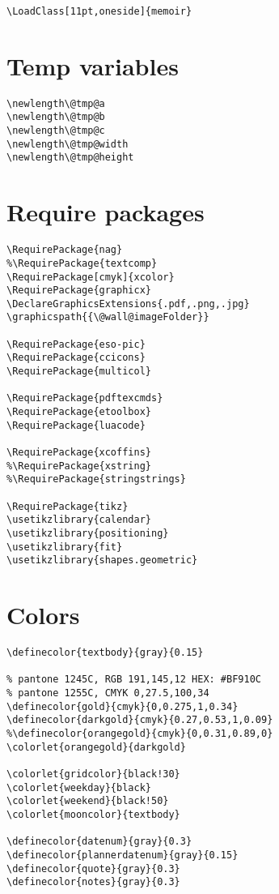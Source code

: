 \documentclass[11pt,oneside]{memoir-article}
\begin{document}
\begin{verbatim}
\LoadClass[11pt,oneside]{memoir}
\end{verbatim}

\section{Temp variables}
\label{sec-6-2}

\begin{verbatim}
\newlength\@tmp@a
\newlength\@tmp@b
\newlength\@tmp@c
\newlength\@tmp@width
\newlength\@tmp@height
\end{verbatim}

\section{Require packages}
\label{sec-6-3}

\begin{verbatim}
\RequirePackage{nag}
%\RequirePackage{textcomp}
\RequirePackage[cmyk]{xcolor}
\RequirePackage{graphicx}
\DeclareGraphicsExtensions{.pdf,.png,.jpg}
\graphicspath{{\@wall@imageFolder}}

\RequirePackage{eso-pic}
\RequirePackage{ccicons}
\RequirePackage{multicol}

\RequirePackage{pdftexcmds}
\RequirePackage{etoolbox}
\RequirePackage{luacode}

\RequirePackage{xcoffins}
%\RequirePackage{xstring}
%\RequirePackage{stringstrings}

\RequirePackage{tikz}
\usetikzlibrary{calendar}
\usetikzlibrary{positioning}
\usetikzlibrary{fit}
\usetikzlibrary{shapes.geometric}
\end{verbatim}

\section{Colors}
\label{sec-6-4}

\begin{verbatim}
\definecolor{textbody}{gray}{0.15}

% pantone 1245C, RGB 191,145,12 HEX: #BF910C
% pantone 1255C, CMYK 0,27.5,100,34
\definecolor{gold}{cmyk}{0,0.275,1,0.34}
\definecolor{darkgold}{cmyk}{0.27,0.53,1,0.09}
%\definecolor{orangegold}{cmyk}{0,0.31,0.89,0}
\colorlet{orangegold}{darkgold}

\colorlet{gridcolor}{black!30}
\colorlet{weekday}{black}
\colorlet{weekend}{black!50}
\colorlet{mooncolor}{textbody}

\definecolor{datenum}{gray}{0.3}
\definecolor{plannerdatenum}{gray}{0.15}
\definecolor{quote}{gray}{0.3}
\definecolor{notes}{gray}{0.3}
\end{verbatim}
\end{document}
